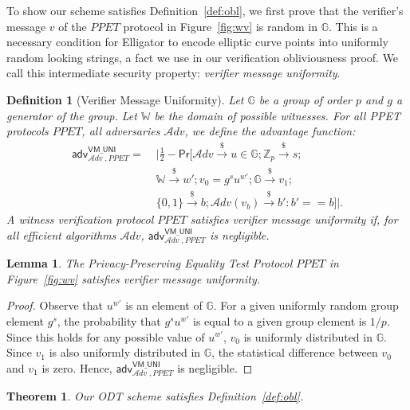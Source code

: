 \documentclass[letterpaper,twocolumn,10pt]{article}
\newcommand{\alg}[1]{\mathsf{#1}}
\newcommand{\adv}{\mathcal{A}dv}
\newcommand{\PR}{\mathsf{Pr}}
\newcommand{\riar}{\xrightarrow{\$}}
\newcommand{\ZZ}{\mathbb{Z}}
\newcommand{\WW}{\mathbb{W}}
\newcommand{\GG}{\mathbb{G}}
\newcommand{\advantage}[2]{\alg{adv}^{#1}_{\adv\;\!,#2}}
\newtheorem{definition}{Definition}
\newtheorem{theorem}{Theorem}
\newtheorem{lemma}{Lemma}
\begin{document}
To show our scheme satisfies Definition~\ref{def:obl}, we first prove that the verifier's message $v$ of the $\mathit{PPET}$ protocol in Figure~\ref{fig:wv} is random in $\GG$.
This is a necessary condition for Elligator to encode elliptic curve points into uniformly random looking strings, a fact we use in our verification obliviousness proof.
We call this intermediate security property: \emph{verifier message uniformity}.

\begin{definition}[Verifier Message Uniformity]
  Let $\GG$ be a group of order $p$ and $g$ a generator of the group.
  Let $\WW$ be the domain of possible witnesses.
  For all PPET protocols $\mathit{PPET}$, all adversaries $\adv$,
  we define the advantage function:
  \begin{equation*}
    \begin{split}
      \advantage{\mathsf{VM\_UNI}}{\mathit{PPET}} = \; & \Big| \frac{1}{2} - \PR \Big[ \adv \riar u \in \GG; \ZZ_p \riar s; \\
         &  \WW \riar w'; v_0 = g^su^{w'}; \GG \riar v_1; \\
         & \{0, 1\} \riar b; \adv(v_b) \riar b': b' == b \Big] \Big|.
    \end{split}
  \end{equation*}
  A witness verification protocol $\mathit{PPET}$ satisfies verifier message uniformity if, for all
  efficient algorithms $\adv$, $\advantage{\mathsf{VM\_UNI}}{\mathit{PPET}}$ is negligible.
\end{definition}

\begin{lemma}
\label{lemma:verifier-message-uniformity}
  The Privacy-Preserving Equality Test Protocol $\mathit{PPET}$ in Figure~\ref{fig:wv} satisfies verifier message uniformity.
\end{lemma}
\begin{proof}
  Observe that $u^{w'}$ is an element of $\GG$.
  For a given uniformly random group element $g^s$, the probability that $g^su^{w'}$ is equal to a
  given group element is $1/p$. Since this holds for any possible value of $u^{w'}$,
  $v_0$ is uniformly distributed in $\GG$.
  Since $v_1$ is also uniformly distributed in $\GG$, the statistical difference between
  $v_0$ and $v_1$ is zero. Hence, $\advantage{\mathsf{VM\_UNI}}{\mathit{PPET}}$ is negligible.
\end{proof}

\begin{theorem}
\label{thm:obl}
  Our ODT scheme satisfies Definition~\ref{def:obl}.
\end{theorem}
\end{document}
